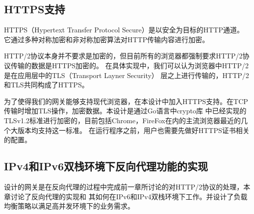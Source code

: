 \documentclass[twoside]{CUGThesis}
\begin{document}
	\subsection{HTTPS支持}
	HTTPS（Hypertext Transfer Protocol Secure）是以安全为目标的HTTP通道。
	它通过多种对称加密和非对称加密算法对HTTP传输内容进行加密。\par 
	HTTP/2协议本身并不要求是加密的，但目前所有的浏览器都强制要求HTTP/2协议传输的数据是HTTPS加密的。
	在具体实现中，我们可以认为浏览器中HTTP/2是在应用层中的TLS（Transport Layner Security）\cite{rescorla2000http}
	层之上进行传输的，HTTP/2和TLS共同构成了HTTPS。\par 
	为了使得我们的网关能够支持现代浏览器，在本设计中加入HTTPS支持。在TCP传输时增加TLS操作，加密数据。本设计是通过Go语言中crypto库
	中已经实现的TLSv1.2标准进行加密的，目前包括Chrome，FireFox在内的主流浏览器最近的几个大版本均支持这一标准。
	在运行程序之前，用户也需要先做好HTTPS证书相关的配置。\par

	\begin{spacing}{2}
		\section{IPv4和IPv6双栈环境下反向代理功能的实现}
	\end{spacing}
	设计的网关是在反向代理的过程中完成前一章所讨论的对HTTP/2协议的处理，本章讨论了反向代理的实现和
	其如何在IPv6和IPv4双栈环境下工作。并设计了负载均衡策略以满足高并发环境下的业务需求。
	
\end{document}
